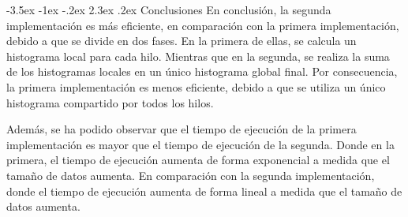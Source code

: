 \documentclass[11pt]{report}
\makeatletter
\renewcommand\chapter{\@startsection{chapter}{0}{\z@}%
    {-3.5ex \@plus -1ex \@minus -.2ex}%
    {2.3ex \@plus.2ex}%
    {\normalfont\Large\bfseries}}
\makeatother
\begin{document}
\chapter{Conclusiones}
En conclusión, la segunda implementación es más eficiente, en comparación con la primera implementación,
debido a que se divide en dos fases. En la primera de ellas, se calcula un histograma local para
cada hilo. Mientras que en la segunda, se realiza la suma de los histogramas locales en un único
histograma global final. Por consecuencia, la primera implementación es menos eficiente, debido a que se utiliza
un único histograma compartido por todos los hilos. 

Además, se ha podido observar que el tiempo de ejecución de la primera implementación es mayor
que el tiempo de ejecución de la segunda. Donde en la primera, el
tiempo de ejecución aumenta de forma exponencial a medida que el tamaño de datos aumenta.
En comparación con la segunda implementación, donde el tiempo de ejecución aumenta de forma lineal a medida que
el tamaño de datos aumenta.
\end{document}
